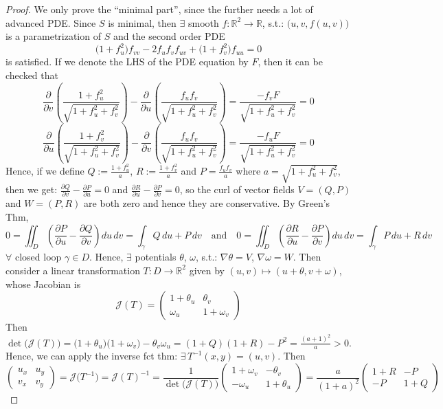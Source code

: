 \begin{proof}
We only prove the ``minimal part'', since the further needs a lot of advanced PDE. Since $S$ is minimal, then $\exists$ smooth $f: \mathbb{R}^2\to\mathbb{R}$, s.t.: $\big(u, v, f(u, v)\big)$ is a parametrization of $S$ and the second order PDE
\[
\big(1 + f_u^2\big)f_{vv} - 2f_uf_vf_{uv} + \big(1 + f_v^2\big)f_{uu} = 0
\]
is satisfied. If we denote the LHS of the PDE equation by $F$, then it can be checked that
\[
\frac{\partial}{\partial v}\left(\frac{1 + f_u^2}{\sqrt{1 + f_u^2 + f_v^2}}\right) - \frac{\partial}{\partial u}\left(\frac{f_uf_v}{\sqrt{1 + f_u^2 + f_v^2}}\right) = \frac{-f_vF}{\sqrt{1 + f_u^2 + f_v^2}} = 0
\]
\[
\frac{\partial}{\partial u}\left(\frac{1 + f_v^2}{\sqrt{1 + f_u^2 + f_v^2}}\right) - \frac{\partial}{\partial v}\left(\frac{f_uf_v}{\sqrt{1 + f_u^2 + f_v^2}}\right) = \frac{-f_uF}{\sqrt{1 + f_u^2 + f_v^2}} = 0
\]
Hence, if we define $Q := \frac{1 + f_u^2}{a}$, $R := \frac{1 + f_v^2}{a}$ and $P = \frac{f_uf_v}{a}$ where $a = \sqrt{1 + f_u^2 + f_v^2}$, then we get: $\frac{\partial Q}{\partial v} - \frac{\partial P}{\partial u} = 0$ and $\frac{\partial R}{\partial u} - \frac{\partial P}{\partial v} = 0$, so the curl of vector fields $V = (Q, P)$ and $W = (P, R)$ are both zero and hence they are conservative. By Green's Thm,
\[
0 = \iint_D\left(\frac{\partial P}{\partial u} - \frac{\partial Q}{\partial v}\right)du\,dv = \int_\gamma Q\,du + P\,dv \quad\text{and}\quad 0 = \iint_D\left(\frac{\partial R}{\partial u} - \frac{\partial P}{\partial v}\right)du\,dv = \int_\gamma P\,du + R\,dv
\]
$\forall$ closed loop $\gamma\in D$. Hence, $\exists$ potentials $\theta$, $\omega$, s.t.: $\nabla\theta = V$, $\nabla\omega = W$. Then consider a linear transformation $T: D\to\mathbb{R}^2$ given by $(u, v)\mapsto(u + \theta, v + \omega)$, whose Jacobian is
\[
\mathcal{J}(T) = \begin{pmatrix}1 + \theta_u & \theta_v\\ \omega_u & 1 + \omega_v\end{pmatrix}
\]
Then $\det\big(\mathcal{J}(T)\big) = \big(1 + \theta_u\big)\big(1 + \omega_v\big) - \theta_v\omega_u = (1 + Q)(1 + R) - P^2 = \frac{(a + 1)^2}{a} > 0$. Hence, we can apply the inverse fct thm: $\exists\, T^{-1}(x, y) = (u, v)$. Then
\[
\begin{pmatrix}u_x & u_y\\ v_x & v_y\end{pmatrix} = \mathcal{J}\big(T^{-1}\big) = \mathcal{J}(T)^{-1} = \frac{1}{\det\big(\mathcal{J}(T)\big)}\begin{pmatrix}1 + \omega_v & -\theta_v\\ -\omega_u & 1 + \theta_u\end{pmatrix} = \frac{a}{(1 + a)^2}\begin{pmatrix}1 + R & -P\\ -P & 1 + Q\end{pmatrix}
\]
\end{proof}
